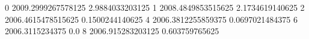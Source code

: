 0 2009.2999267578125 2.9884033203125
1 2008.4849853515625 2.1734619140625
2 2006.4615478515625 0.1500244140625
4 2006.3812255859375 0.0697021484375
6 2006.3115234375 0.0
8 2006.915283203125 0.603759765625
